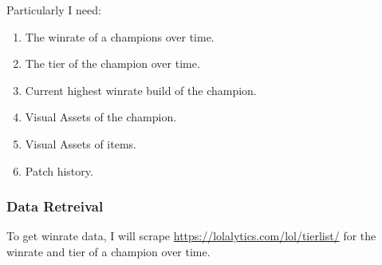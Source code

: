 \documentclass{article}
\begin{document}
Particularly I need:
\begin{enumerate}
  \item The winrate of a champions over time.
  \item The tier of the champion over time.
  \item Current highest winrate build of the champion.
  \item Visual Assets of the champion.
  \item Visual Assets of items.
  \item Patch history.
\end{enumerate}

\subsubsection{Data Retreival} 
\label{subsubsec:Data Retreival}

To get winrate data, I will scrape \url{https://lolalytics.com/lol/tierlist/} for the winrate and tier of a champion over time.







\begin{refcontext}[sorting=nyt]
\printbibliography
\end{refcontext}
\end{document}
